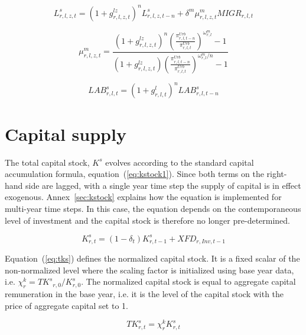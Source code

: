 \documentclass[11pt,letterpaper]{report}
\begin{document}
\begin{equation}
\label{eq:ls}
\mathit{L^s_{r,l,z,t}} =
   \left( 1 + g^{\mathit{lz}}_{r,l,z,t} \right)^n \mathit{L}^s_{r,l,z,t-n}
   + \delta^m \mu^m_{r,l,z,t}\mathit{MIGR}_{r,l,t}
\end{equation}

\begin{equation}
\label{eq:migrMult}
\mu^m_{r,l,z,t} =
   \frac { \left( 1 + g^{\mathit{lz}}_{r,l,z,t} \right)^n
      \left( \frac{\pi^{\mathit{Urb}}_{r,l,t-n}}{\pi^{\mathit{Urb}}_{r,l,t}}
      \right)^{\omega^m_{r,l}} - 1
   }
   { \left( 1 + g^{\mathit{lz}}_{r,l,z,t} \right)
     \left( \frac{\pi^{\mathit{Urb}}_{r,l,t-n}}{\pi^{\mathit{Urb}}_{r,l,t}}
     \right)^{\omega^m_{r,l}/n} - 1
   }
\end{equation}

\begin{equation}
\label{eq:glab}
\mathit{LAB}^s_{r,l,t} =
   \left( 1 + g^l_{r,l,t} \right)^n \mathit{LAB}^s_{r,l,t-n}
\end{equation}

\section{Capital supply}

The total capital stock, $K^s$ evolves according to the standard capital accumulation
formula, equation~(\ref{eq:kstock1}).
Since both terms on the right-hand side are lagged, with a single year time step
the supply of capital is in effect exogenous.
Annex~{\ref{sec:kstock}} explains how the
equation is implemented for multi-year time
steps. In this case, the equation depends
on the contemporaneous level of investment and
the capital stock is therefore no longer
pre-determined.

\begin{equation}
\label{eq:kstock1}
K^s_{r,t} = \left(1- \delta_t \right) K^s_{r,t-1} + \mathit{XFD}_{r,\mathit{Inv},t-1}
\end{equation}

Equation~(\ref{eq:tks}) defines the
normalized capital stock. It is a fixed scalar of the non-normalized level where
the scaling factor is initialized using base year data,
i.e. $\chi^k_r = \mathit{TK^s}_{r,0}/K^s_{r,0}$.
The normalized capital stock is equal to aggregate
capital remuneration in the base year, i.e. it
is the level of the capital stock with the
price of aggregate capital set to 1.

\begin{equation}
\label{eq:tks}
\mathit{TK^s_{r,t}} = \chi^k_r \mathit{K^s_{r,t}}
\end{equation}
\end{document}
